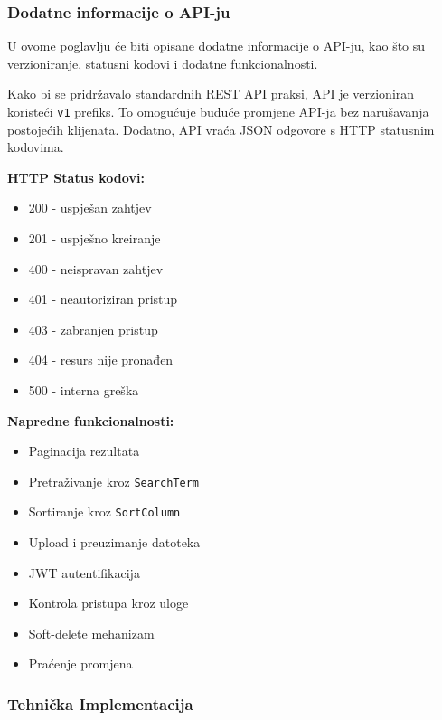 \documentclass[a4paper,12pt]{article}
\begin{document}
\subsubsection{Dodatne informacije o API-ju}

U ovome poglavlju će biti opisane dodatne informacije o API-ju, kao što su verzioniranje, statusni kodovi i dodatne funkcionalnosti.

Kako bi se pridržavalo standardnih REST API praksi, API je verzioniran koristeći \texttt{v1} prefiks. To omogućuje buduće promjene API-ja bez narušavanja postojećih klijenata. Dodatno, API vraća JSON odgovore s HTTP statusnim kodovima.

\noindent\textbf{HTTP Status kodovi:}
\begin{multicols}{2}
\begin{itemize}
    \item 200 - uspješan zahtjev
    \item 201 - uspješno kreiranje
    \item 400 - neispravan zahtjev
    \item 401 - neautoriziran pristup
    \item 403 - zabranjen pristup
    \item 404 - resurs nije pronađen
    \item 500 - interna greška
\end{itemize}
\end{multicols}

\noindent\textbf{Napredne funkcionalnosti:}
\begin{multicols}{2}
\begin{itemize}
    \item Paginacija rezultata
    \item Pretraživanje kroz \texttt{SearchTerm}
    \item Sortiranje kroz \texttt{SortColumn}
    \item Upload i preuzimanje datoteka
    \item JWT autentifikacija
    \item Kontrola pristupa kroz uloge
    \item Soft-delete mehanizam
    \item Praćenje promjena
\end{itemize}
\end{multicols}

\subsubsection{Tehnička Implementacija}
\end{document}
